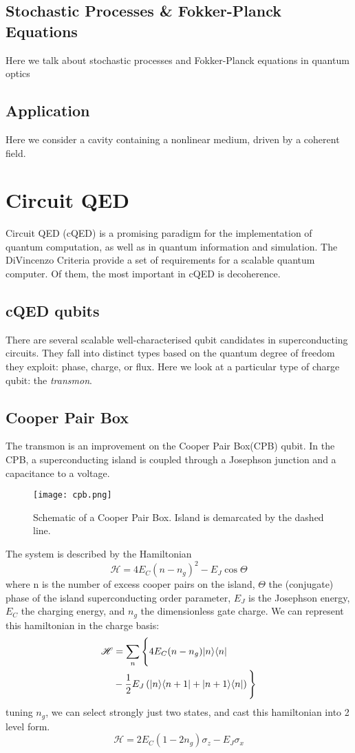 \subsection{Stochastic Processes \& Fokker-Planck Equations}
Here we talk about stochastic processes and Fokker-Planck equations in quantum optics 
\cite{Carmichael1992} 
\cite{Carmichael2008} 
\cite{Breuer2002} 
\subsection{Application}
Here we consider a cavity containing a nonlinear medium, driven by a coherent field. \cite{Drummond1979}
\section{Circuit QED}
Circuit QED (cQED) is a promising paradigm for the implementation of quantum computation, as well as in quantum information and simulation.
The DiVincenzo Criteria \cite{DiVincenzo} provide a set of requirements for a scalable quantum computer. 
Of them, the most important in cQED is decoherence. 
\subsection{cQED qubits}
There are several scalable well-characterised qubit candidates in superconducting circuits\cite{Makhlin2001}.
They fall into distinct types based on the quantum degree of freedom they exploit: phase, charge, or flux.
Here we look at a particular type of charge qubit: the \emph{transmon}.
\subsection{Cooper Pair Box}
The transmon is an improvement on the Cooper Pair Box(CPB) qubit.
In the CPB, a superconducting island is coupled through a Josephson junction and a capacitance to a voltage.
\begin{figure}[t]
  \texttt{[image: cpb.png]}
  \caption{Schematic of a Cooper Pair Box. Island is demarcated by the dashed line.}
\end{figure}
The system is described by the Hamiltonian\cite{Makhlin2001}
\begin{equation}
  \mathscr{H} = 4E_C(n-n_g)^2 - E_J \cos \Theta
\end{equation}
where n is the number of excess cooper pairs on the island, $\Theta$ the (conjugate) phase of the island superconducting order parameter, $E_J$ is the Josephson energy, $E_C$ the charging energy, and $n_g$ the dimensionless gate charge.
We can represent this hamiltonian in the charge basis:
\begin{align}
  \mathscr{H} &= \sum_n \Bigg\{ 4 E_C (n-n_g) | n \rangle \langle n |\\ 
              &- \frac{1}{2} E_J \left( | n \rangle \langle n+1 | 
                                       + | n+1 \rangle \langle n | \right) \Bigg\}
\end{align}
tuning $n_g$, we can select strongly just two states, and cast this hamiltonian into 2 level form.
\begin{equation}
  \mathscr{H} = 2E_C ( 1-2n_g ) \sigma_z - E_J \sigma_x 
\end{equation}
